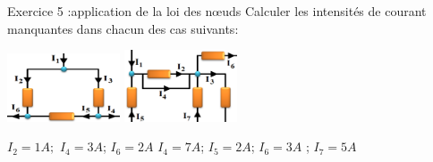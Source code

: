 \documentclass[12pt, french]{article}
\begin{document}
\begin{Box2}{Exercice 5 :application de la loi des nœuds  }
	Calculer les intensités de courant manquantes dans chacun des cas suivants:
\begin{center}

	\includegraphics[width=0.25\textwidth]{./img/ex0501.png}
	\hspace{4cm}
	\includegraphics[width=0.25\textwidth]{./img/ex0502.png}
  \end{center}

 \hspace{2cm } $I_2=1A;$ $I_4=3A$; $I_6=2A$
 \hspace{4cm}  $I_4=7A$; $I_5=2A$; $I_6=3A$ ; $I_7=5A$
\end{Box2}
\end{document}
